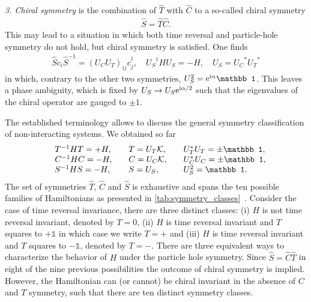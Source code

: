 {\it 3. Chiral symmetry} is the combination of $\hat T$ with $\hat C$ to a so-called chiral symmetry
\begin{align}
    \hat S = \hat T \hat C.
\end{align}
This may lead to a situation in which both time reversal and particle-hole symmetry do not hold, but chiral symmetry is satisfied.
One finds
\begin{align}
    \hat S c_i \hat S^{-1} = (U_CU_T)_{ij}c^\dag_j
    ,\quad
    {U_S}^\dag H {U_S} = -H
    ,\quad
    {U_S} = {U_C}^* {U_T}^*
\end{align}
in which, contrary to the other two symmetries, $U_S^2=\re^{\ri\alpha}\mathbb1$.
This leaves a phase ambiguity, which is fixed by $U_S\rightarrow U_S\mathrm e^{\mathrm i\alpha/2}$ such that the eigenvalues of the chiral operator are gauged to $\pm1$.

The established terminology allows to discuss the general symmetry classification of non-interacting systems.
We obtained so far
\begin{align}
    \begin{array}{l l l l }
        & T^{-1}HT = +H
        ,\quad
        & T = U_T\mathcal K
        ,\quad
        & U_T^*U_T = \pm\mathbb1,\\
        & C^{-1}HC = -H
        ,\quad
        & C = U_C\mathcal K
        ,\quad
        & U_C^*U_C = \pm\mathbb1,\\
        & S^{-1}HS = -H
        ,\quad
        & S = U_S
        ,\qquad
        & U_S^2 = \mathbb1.
    \end{array}
    \label{eq:symmetry_real_space}
\end{align}
The set of symmetries $\hat T$, $\hat C$ and $\hat S$ is exhaustive and spans the ten possible families of Hamiltonians as presented in \cref{tab:symmetry_classes}~\cite{Chiu2016}.
Consider the case of time reversal invariance, there are three distinct classes:
(i) $H$ is not time reversal invariant, denoted by $T=0$, (ii) $H$ is time reversal invariant and $T$ squares to $+\mathbb1$ in which case we write $T=+$ and (iii) $H$ is time reversal invariant and $T$ squares to $-\mathbb1$, denoted by $T=-$.
There are three equivalent ways to characterize the behavior of $H$ under the particle hole symmetry.
Since $\hat S = \hat C\hat T$ in eight of the nine previous possibilities the outcome of chiral symmetry is implied.
However, the Hamiltonian can (or cannot) be chiral invariant in the absence of $C$ and $T$ symmetry, such that there are ten distinct symmetry classes.

